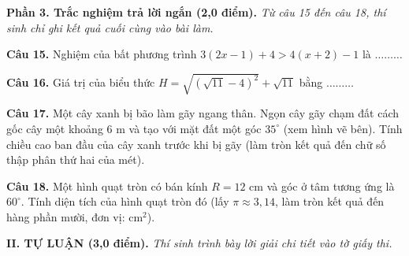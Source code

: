 \documentclass[11pt,a4paper]{article}
\begin{document}
\vspace{3mm}
\noindent
\textbf{Phần 3. Trắc nghiệm trả lời ngắn (2,0 điểm).} \textit{Từ câu 15 đến câu 18, thí sinh chỉ ghi kết quả cuối cùng vào bài làm.}

\vspace{1.5mm}
\textbf{Câu 15.} Nghiệm của bất phương trình $3(2x - 1) + 4 > 4(x + 2) - 1$ là $\dots\dots\dots$

\vspace{1.5mm}
\textbf{Câu 16.} Giá trị của biểu thức $H = \sqrt{(\sqrt{11} - 4)^2} + \sqrt{11}$ bằng $\dots\dots\dots$

\vspace{1.5mm}
\noindent
\begin{minipage}[c]{0.65\linewidth}
\textbf{Câu 17.} Một cây xanh bị bão làm gãy ngang thân. Ngọn cây gãy chạm đất cách gốc cây một khoảng $6\text{ m}$ và tạo với mặt đất một góc $35^\circ$ (xem hình vẽ bên). Tính chiều cao ban đầu của cây xanh trước khi bị gãy (làm tròn kết quả đến chữ số thập phân thứ hai của mét).
\end{minipage}\hfill
\begin{minipage}[c]{0.32\linewidth}
\centering
{}
\end{minipage}

\vspace{1.5mm}
\textbf{Câu 18.} Một hình quạt tròn có bán kính $R = 12\text{ cm}$ và góc ở tâm tương ứng là $60^\circ$. Tính diện tích của hình quạt tròn đó (lấy $\pi \approx 3{,}14$, làm tròn kết quả đến hàng phần mười, đơn vị: $\text{cm}^2$).

\vspace{4mm}
\noindent
\textbf{\large II. TỰ LUẬN (3,0 điểm).} \textit{Thí sinh trình bày lời giải chi tiết vào tờ giấy thi.}
\end{document}

